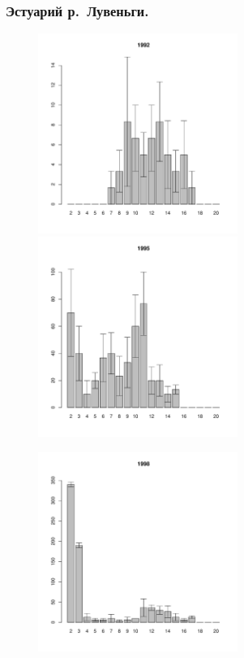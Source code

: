 \documentclass[12pt, a4paper]{article}
\begin{document}
\subsubsection{Эстуарий р.~Лувеньги.}





\begin{figure}[h]

\begin{multicols}{3}
\hfill
\includegraphics[width=65mm]{../White_Sea/Estuatiy_Luvenga/sizestr2_1992_.pdf}
\hfill
\includegraphics[width=65mm]{../White_Sea/Estuatiy_Luvenga/sizestr2_1995_.pdf}

\hfill
\includegraphics[width=65mm]{../White_Sea/Estuatiy_Luvenga/sizestr2_1998_.pdf}


\end{multicols}
\end{figure}
\end{document}
